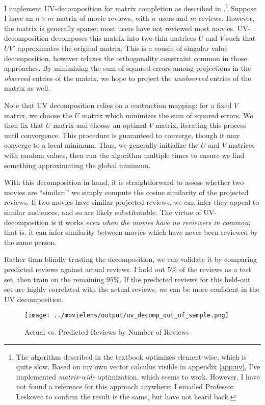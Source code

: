 \documentclass{article}
\begin{document}
I implement UV-decomposition for matrix completion as described in \textcite{leskovec2020MMD}.\footnote{The algorithm described in the textbook optimizes element-wise, which is quite slow. Based on my own vector calculus visible in appendix \ref{app:uv}, I've implemented \emph{matrix-wide} optimization, which seems to work. However, I have not found a reference for this approach anywhere; I emailed Professor Leskovec to confirm the result is the same, but have not heard back.} Suppose I have an $n \times m$ matrix of movie reviews, with $n$ users and $m$ reviews. However, the matrix is generally sparse; most users have not reviewed most movies. UV-decomposition decomposes this matrix into two thin matrices $U$ and $V$ such that $UV'$ approximates the original matrix. This is a cousin of singular value decomposition, however relaxes the orthogonality constraint common in those approaches. By minimizing the sum of squared errors among projections in the \emph{observed} entries of the matrix, we hope to project the \emph{unobserved} entries of the matrix as well. 

Note that UV decomposition relies on a contraction mapping: for a fixed $V$ matrix, we choose the $U$ matrix which minimizes the sum of squared errors. We then fix that $U$ matrix and choose an optimal $V$ matrix, iterating this process until convergence. This procedure is guaranteed to converge, though it may converge to a local minimum. Thus, we generally initialize the $U$ and $V$ matrices with random values, then run the algorithm multiple times to ensure we find something approximating the global minimum. 

With this decomposition in hand, it is straightforward to assess whether two movies are ``similar:'' we simply compute the cosine similarity of the projected reviews. If two movies have similar projected reviews, we can infer they appeal to similar audiences, and so are likely substitutable. The virtue of UV-decomposition is it works \emph{even when the movies have no reviewers in common}; that is, it can infer similarity between movies which have never been reviewed by the same person.

Rather than blindly trusting the decomposition, we can validate it by comparing predicted reviews against actual reviews. I hold out 5\% of the reviews as a test set, then train on the remaining 95\%. If the predicted reviews for this held-out set are highly correlated with the actual reviews, we can be more confident in the UV decomposition.

\begin{figure}
    \begin{center}
    \texttt{[image: ../movielens/output/uv\_decomp\_out\_of\_sample.png]}
    \caption{Actual vs. Predicted Reviews by Number of Reviews}
    \label{fig:actual_vs_predicted}
    \end{center}
\end{figure}
\end{document}

